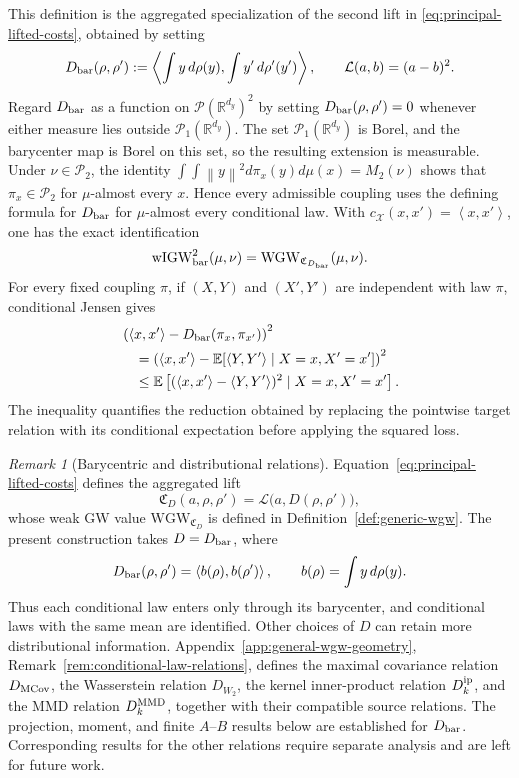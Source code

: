 \documentclass[11pt]{article}
\newcommand{\R}{\mathbb R}
\newcommand{\E}{\mathbb E}
\newcommand{\cP}{\mathcal P}
\newcommand{\ip}[2]{\left\langle #1,#2\right\rangle}
\newcommand{\norm}[1]{\left\lVert #1\right\rVert}
\newcommand{\wIGW}{\mathrm{wIGW}_{\mathrm{bar}}}
\newcommand{\WGW}{\mathrm{WGW}}
\theoremstyle{plain}
\theoremstyle{definition}
\theoremstyle{remark}
\newtheorem{remark}[theorem]{Remark}
\begin{document}
\Needspace{0.18\textheight}
This definition is the aggregated specialization of the second lift in
\eqref{eq:principal-lifted-costs}, obtained by setting
\[
 D_{\rm bar}(\rho,\rho')
 :=\ip{\int y\,d\rho(y)}{\int y'\,d\rho'(y')},
 \qquad \mathcal L(a,b)=(a-b)^2.
\]
Regard $D_{\rm bar}$ as a function on $\cP(\R^{d_y})^2$ by setting
$D_{\rm bar}(\rho,\rho')=0$ whenever either measure lies outside
$\cP_1(\R^{d_y})$. The set $\cP_1(\R^{d_y})$ is Borel, and the barycenter map is
Borel on this set, so the resulting extension is measurable. Under
$\nu\in\cP_2$, the identity
$\int\!\int\norm y^2d\pi_x(y)d\mu(x)=M_2(\nu)$ shows that
$\pi_x\in\cP_2$ for $\mu$-almost every $x$. Hence every admissible coupling uses
the defining formula for $D_{\rm bar}$ for $\mu$-almost every conditional law.
With $c_{\mathcal X}(x,x')=\ip{x}{x'}$, one has the exact identification
\[
 \wIGW^2(\mu,\nu)=\WGW_{\mathfrak C_{D_{\rm bar}}}(\mu,\nu).
\]
For every fixed coupling $\pi$, if $(X,Y)$ and $(X',Y')$ are independent with
law $\pi$, conditional Jensen gives
\[
\begin{aligned}
 &\left(\ip{x}{x'}-D_{\rm bar}(\pi_x,\pi_{x'})\right)^2\\
 &\quad=\left(\ip{x}{x'}-
 \E[\ip{Y}{Y'}\mid X=x,X'=x']\right)^2\\
 &\quad\le \E\left[(\ip{x}{x'}-\ip{Y}{Y'})^2
 \mid X=x,X'=x'\right].
\end{aligned}
\]
The inequality quantifies the reduction obtained by replacing the pointwise target
relation with its conditional expectation before applying the squared loss.

\begin{remark}[Barycentric and distributional relations]
\label{rem:conditional-law-alternatives}
Equation~\eqref{eq:principal-lifted-costs} defines the aggregated lift
\[
  \mathfrak C_D(a,\rho,\rho')
  =\mathcal L\bigl(a,D(\rho,\rho')\bigr),
\]
whose weak GW value $\WGW_{\mathfrak C_D}$ is defined in
Definition~\ref{def:generic-wgw}. The present construction takes
$D=D_{\rm bar}$, where
\[
  D_{\rm bar}(\rho,\rho')
  =\ip{b(\rho)}{b(\rho')},
  \qquad b(\rho)=\int y\,d\rho(y).
\]
Thus each conditional law enters only through its barycenter, and conditional laws
with the same mean are identified. Other choices of $D$ can retain more
distributional information. Appendix~\ref{app:general-wgw-geometry},
Remark~\ref{rem:conditional-law-relations}, defines the maximal covariance relation
$D_{\rm MCov}$, the Wasserstein relation $D_{W_2}$, the kernel inner-product relation
$D_k^{\rm ip}$, and the MMD relation $D_k^{\rm MMD}$, together with their compatible
source relations. The projection, moment, and finite $A$--$B$ results below are
established for $D_{\rm bar}$. Corresponding results for the other relations require
separate analysis and are left for future work.
\end{remark}
\end{document}
